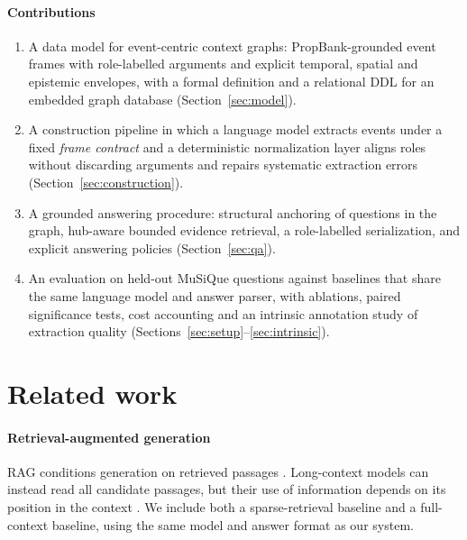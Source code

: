 \documentclass[preprint,12pt,authoryear]{elsarticle}
\begin{document}
\paragraph{Contributions}
\begin{enumerate}
\item A data model for event-centric context graphs: PropBank-grounded event frames with role-labelled arguments and explicit temporal, spatial and epistemic envelopes, with a formal definition and a relational DDL for an embedded graph database (Section~\ref{sec:model}).
\item A construction pipeline in which a language model extracts events under a fixed \emph{frame contract} and a deterministic normalization layer aligns roles without discarding arguments and repairs systematic extraction errors (Section~\ref{sec:construction}).
\item A grounded answering procedure: structural anchoring of questions in the graph, hub-aware bounded evidence retrieval, a role-labelled serialization, and explicit answering policies (Section~\ref{sec:qa}).
\item An evaluation on held-out MuSiQue questions \citep{trivedi2022musique} against baselines that share the same language model and answer parser, with ablations, paired significance tests, cost accounting and an intrinsic annotation study of extraction quality (Sections~\ref{sec:setup}--\ref{sec:intrinsic}).
\end{enumerate}

\section{Related work}
\label{sec:related}

\paragraph{Retrieval-augmented generation}
RAG conditions generation on retrieved passages \citep{lewis2020rag}.
Long-context models can instead read all candidate passages, but their use of information depends on its position in the context \citep{liu2024lost}.
We include both a sparse-retrieval baseline \citep{robertson2009bm25} and a full-context baseline, using the same model and answer format as our system.
\end{document}
